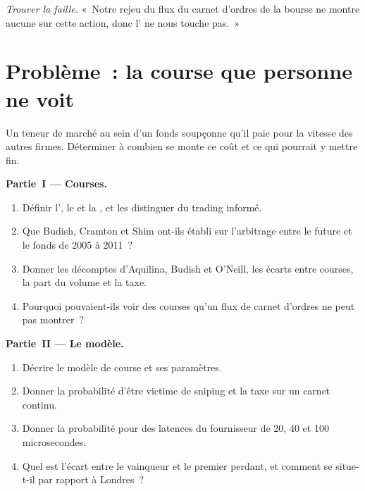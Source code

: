 \begin{exercise}[$\star\star\star$]\label{exo:hf:latency-arbitrage-and-its-defence:8}
\emph{Trouver la faille.} «~Notre rejeu du flux du carnet d'ordres de la bourse ne montre aucune  sur cette action, donc l' ne nous touche pas.~»
\end{exercise}

\section{Problème~: la course que personne ne voit}

\begin{problem}\label{pb:hf:latency-arbitrage-and-its-defence:1}
Un teneur de marché au sein d'un fonds soupçonne qu'il paie pour la vitesse des autres firmes. Déterminer à combien se monte ce coût et ce qui pourrait y mettre fin.

\medskip\noindent\textbf{Partie~I --- Courses.}
\begin{enumerate}
\item Définir l', le  et la , et les distinguer
du trading informé.
\item Que Budish, Cramton et Shim ont-ils établi sur l'arbitrage entre le future et le fonds de 2005 à 2011~?
\item Donner les décomptes d'Aquilina, Budish et O'Neill, les écarts entre courses, la part du volume et la taxe.
\item Pourquoi pouvaient-ils voir des courses qu'un flux de carnet d'ordres ne peut pas montrer~?
\end{enumerate}

\medskip\noindent\textbf{Partie~II --- Le modèle.}
\begin{enumerate}[resume]
\item Décrire le modèle de course et ses paramètres.
\item Donner la probabilité d'être victime de sniping et la taxe sur un carnet continu.
\item Donner la probabilité pour des latences du fournisseur de 20, 40 et 100 microsecondes.
\item Quel est l'écart entre le vainqueur et le premier perdant, et comment se situe-t-il par rapport à Londres~?
\end{enumerate}


\end{problem}
